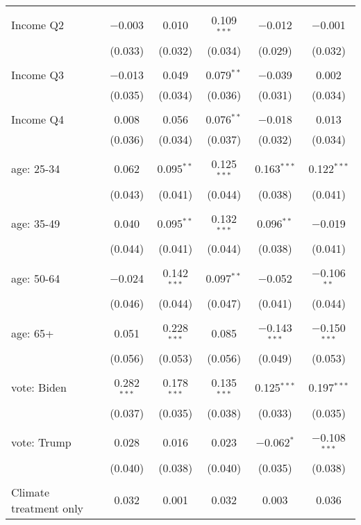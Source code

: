 \begin{tabular}{@{\extracolsep{5pt}}lccccc}
  & & & & & \\ 
 Income Q2 & $-$0.003 & 0.010 & 0.109$^{***}$ & $-$0.012 & $-$0.001 \\ 
  & (0.033) & (0.032) & (0.034) & (0.029) & (0.032) \\ 
  & & & & & \\ 
 Income Q3 & $-$0.013 & 0.049 & 0.079$^{**}$ & $-$0.039 & 0.002 \\ 
  & (0.035) & (0.034) & (0.036) & (0.031) & (0.034) \\ 
  & & & & & \\ 
 Income Q4 & 0.008 & 0.056 & 0.076$^{**}$ & $-$0.018 & 0.013 \\ 
  & (0.036) & (0.034) & (0.037) & (0.032) & (0.034) \\ 
  & & & & & \\ 
 age: 25-34 & 0.062 & 0.095$^{**}$ & 0.125$^{***}$ & 0.163$^{***}$ & 0.122$^{***}$ \\ 
  & (0.043) & (0.041) & (0.044) & (0.038) & (0.041) \\ 
  & & & & & \\ 
 age: 35-49 & 0.040 & 0.095$^{**}$ & 0.132$^{***}$ & 0.096$^{**}$ & $-$0.019 \\ 
  & (0.044) & (0.041) & (0.044) & (0.038) & (0.041) \\ 
  & & & & & \\ 
 age: 50-64 & $-$0.024 & 0.142$^{***}$ & 0.097$^{**}$ & $-$0.052 & $-$0.106$^{**}$ \\ 
  & (0.046) & (0.044) & (0.047) & (0.041) & (0.044) \\ 
  & & & & & \\ 
 age: 65+ & 0.051 & 0.228$^{***}$ & 0.085 & $-$0.143$^{***}$ & $-$0.150$^{***}$ \\ 
  & (0.056) & (0.053) & (0.056) & (0.049) & (0.053) \\ 
  & & & & & \\ 
 vote: Biden & 0.282$^{***}$ & 0.178$^{***}$ & 0.135$^{***}$ & 0.125$^{***}$ & 0.197$^{***}$ \\ 
  & (0.037) & (0.035) & (0.038) & (0.033) & (0.035) \\ 
  & & & & & \\ 
 vote: Trump & 0.028 & 0.016 & 0.023 & $-$0.062$^{*}$ & $-$0.108$^{***}$ \\ 
  & (0.040) & (0.038) & (0.040) & (0.035) & (0.038) \\ 
  & & & & & \\ 
 Climate treatment only & 0.032 & 0.001 & 0.032 & 0.003 & 0.036 \\ 

\end{tabular}
